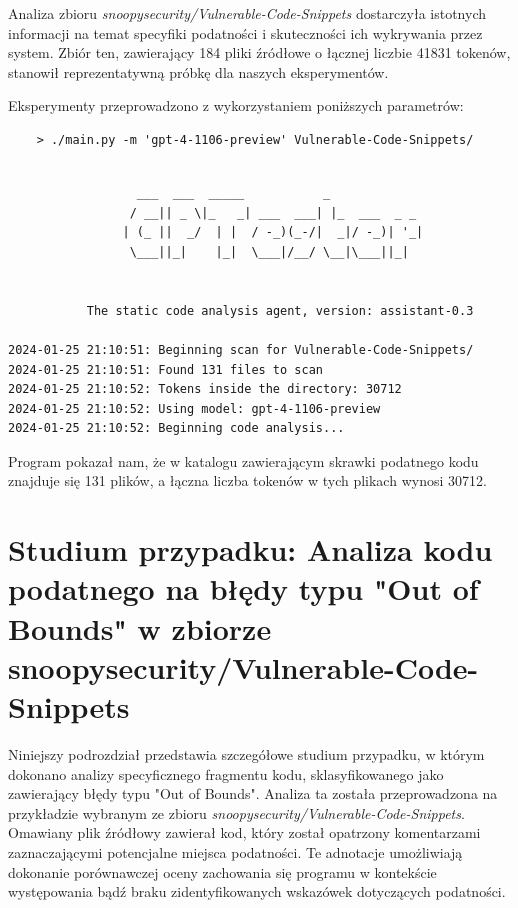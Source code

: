 Analiza zbioru \textit{snoopysecurity/Vulnerable-Code-Snippets} dostarczyła istotnych informacji na temat specyfiki podatności i skuteczności ich wykrywania przez system. Zbiór ten, zawierający 184 pliki źródłowe o łącznej liczbie 41831 tokenów, stanowił reprezentatywną próbkę dla naszych eksperymentów.

Eksperymenty przeprowadzono z wykorzystaniem poniższych parametrów:
\begin{verbatim}
    > ./main.py -m 'gpt-4-1106-preview' Vulnerable-Code-Snippets/
\end{verbatim}


\begin{verbatim}

                  ___  ___  _____           _             
                 / __|| _ \|_   _| ___  ___| |_  ___  _ _ 
                | (_ ||  _/  | |  / -_)(_-/|  _|/ -_)| '_|
                 \___||_|    |_|  \___|/__/ \__|\___||_|  


           The static code analysis agent, version: assistant-0.3

2024-01-25 21:10:51: Beginning scan for Vulnerable-Code-Snippets/
2024-01-25 21:10:51: Found 131 files to scan
2024-01-25 21:10:52: Tokens inside the directory: 30712
2024-01-25 21:10:52: Using model: gpt-4-1106-preview
2024-01-25 21:10:52: Beginning code analysis...

\end{verbatim}

Program pokazał nam, że w katalogu zawierającym skrawki podatnego kodu znajduje się 131 plików, a łączna liczba tokenów w tych plikach wynosi 30712.
\newpage
\section{Studium przypadku: Analiza kodu podatnego na błędy typu "Out of Bounds" w zbiorze snoopysecurity/Vulnerable-Code-Snippets}
\label{sec:analiza_blednego_kodu}

Niniejszy podrozdział przedstawia szczegółowe studium przypadku, w którym dokonano analizy specyficznego fragmentu kodu, sklasyfikowanego jako zawierający błędy typu "Out of Bounds". Analiza ta została przeprowadzona na przykładzie wybranym ze zbioru \textit{snoopysecurity/Vulnerable-Code-Snippets}. Omawiany plik źródłowy zawierał kod, który został opatrzony komentarzami zaznaczającymi potencjalne miejsca podatności. Te adnotacje umożliwiają dokonanie porównawczej oceny zachowania się programu w kontekście występowania bądź braku zidentyfikowanych wskazówek dotyczących podatności.


